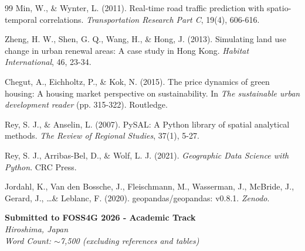 \documentclass[11pt,a4paper]{article}
\begin{document}
\begin{thebibliography}{99}
Min, W., \& Wynter, L. (2011). Real-time road traffic prediction with spatio-temporal correlations. \textit{Transportation Research Part C}, 19(4), 606-616.

Zheng, H. W., Shen, G. Q., Wang, H., \& Hong, J. (2013). Simulating land use change in urban renewal areas: A case study in Hong Kong. \textit{Habitat International}, 46, 23-34.

Chegut, A., Eichholtz, P., \& Kok, N. (2015). The price dynamics of green housing: A housing market perspective on sustainability. In \textit{The sustainable urban development reader} (pp. 315-322). Routledge.

Rey, S. J., \& Anselin, L. (2007). PySAL: A Python library of spatial analytical methods. \textit{The Review of Regional Studies}, 37(1), 5-27.

Rey, S. J., Arribas-Bel, D., \& Wolf, L. J. (2021). \textit{Geographic Data Science with Python}. CRC Press.

Jordahl, K., Van den Bossche, J., Fleischmann, M., Wasserman, J., McBride, J., Gerard, J., \ldots \& Leblanc, F. (2020). geopandas/geopandas: v0.8.1. \textit{Zenodo}.

\end{thebibliography}

\vspace{1cm}
\noindent\textbf{Submitted to FOSS4G 2026 - Academic Track}\\
\textit{Hiroshima, Japan}\\
\textit{Word Count: $\sim$7,500 (excluding references and tables)}
\end{document}
